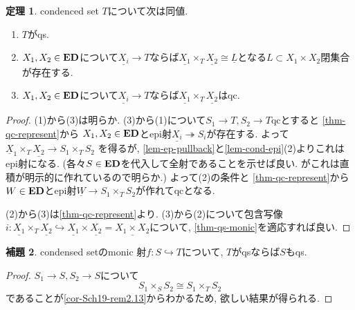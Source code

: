 \documentclass[dvipdfmx,a4paper,11pt]{report}
\theoremstyle{definition}
\newtheorem{thm}{定理}
\newtheorem{lem}[thm]{補題}
\begin{document}
 \begin{tcolorbox}
 [colback = white, colframe = green!35!black, fonttitle = \bfseries,breakable = true]
 \begin{thm}\cite[Proposition 4.11.12]{Bar22}
 \label{thm-qs}
condenced set $T$について次は同値.
\begin{enumerate}
\item $T$がqs.
\item $X_1, X_2 \in {\bf ED}$について$\underline{X_i} \to T$ならば$\underline{X_1}  \times_{T}\underline{X_2} \cong \underline{L}$となる$L \subset X_1 \times X_2$閉集合が存在する. 
\item $X_1, X_2 \in {\bf ED}$について$\underline{X_i} \to T$ならば$\underline{X_1}  \times_{T}\underline{X_2} $はqc.
\end{enumerate}
 \end{thm}
 \end{tcolorbox}
 \begin{proof}
 (1)から(3)は明らか.
 (3)から(1)について$S_1 \to T, S_2 \to T$qcとすると
 \ref{thm-qc-represent}から
 $X_1, X_2 \in {\bf ED}$とepi射$\underline{X_i} \twoheadrightarrow S_i$が存在する.
 よって$\underline{X}_1 \times_{T} \underline{X_2} \to S_1 \times_{T} S_2$
 を得るが, \ref{lem-ep-pullback}と\ref{lem-cond-epi}(2)よりこれはepi射になる.
 (各々$S \in {\bf ED}$を代入して全射であることを示せば良い. がこれは直積が明示的に作れているので明らか.)
 よって(2)の条件と \ref{thm-qc-represent}から $W\in {\bf ED}$とepi射$\underline{W} \to S_1 \times_{T} S_2$が作れてqcとなる. 
 
 (2)から(3)は\ref{thm-qc-represent}より.
 (3)から(2)について包含写像$i : \underline{X_1}  \times_{T}\underline{X_2} \hookrightarrow \underline{X_1} \times \underline{X_2} = \underline{X_1 \times X_2}$について, \ref{thm-qs-monic}を適応すれば良い. 
 \end{proof}

  \begin{tcolorbox}
 [colback = white, colframe = green!35!black, fonttitle = \bfseries,breakable = true]
\begin{lem}
\label{lem-qs-sub}
condensed setのmonic 射$f : S \hookrightarrow T$について, $T$がqsならば$S$もqs.
\end{lem}
\end{tcolorbox}
\begin{proof}
$S_1 \to S, S_2 \to S$について
$$
S_1 \times_S S_2 \cong S_1 \times_T S_2
$$
であることが\ref{cor-Sch19-rem2.13}からわかるため, 欲しい結果が得られる. 
\end{proof}
\end{document}
